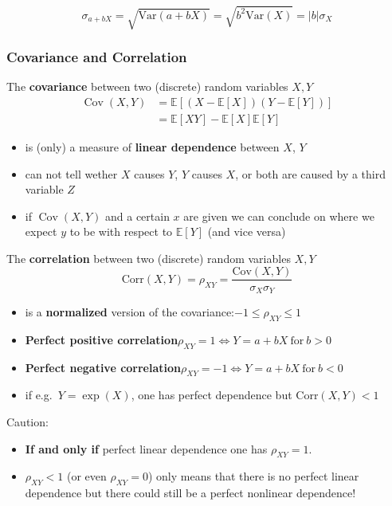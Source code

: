 \noindent\begin{equation*}
    \sigma_{a+bX}=\sqrt{\mathrm{Var}(a+bX)}=\sqrt{b^2\mathrm{Var}(X)}=|b|\sigma_X
\end{equation*}

\subsubsection{Covariance and Correlation}
The \textbf{covariance} between two (discrete) random variables $X,Y$
\noindent\begin{align*}
    \operatorname{Cov}(X,Y) & =\mathbb{E}[(X-\mathbb{E}[X])(Y-\mathbb{E}[Y])] \\
                            & = \mathbb{E}[XY]-\mathbb{E}[X]\mathbb{E}[Y]
\end{align*}
\begin{itemize}
    \item is (only) a measure of \textbf{linear dependence} between $X$, $Y$
    \item can not tell wether $X$ causes $Y$, $Y$ causes $X$, or both are caused by a third variable $Z$
    \item if $\operatorname{Cov}(X,Y)$ and a certain $x$ are given we can conclude on where we expect $y$ to be with respect to $\mathbb{E}[Y]$ (and vice versa)
\end{itemize}

\newpar{}
The \textbf{correlation} between two (discrete) random variables $X,Y$
\noindent\begin{equation*}
    \mathrm{Corr}(X,Y)=\rho_{XY}=\frac{\mathrm{Cov}(X,Y)}{\sigma_{X}\sigma_{Y}}
\end{equation*}
\begin{itemize}
    \item is a \textbf{normalized} version of the covariance:\newline$-1 \leq \rho_{XY} \leq 1$
    \item \textbf{Perfect positive correlation}\newline $\rho_{XY}=1\Leftrightarrow Y=a+bX\mathrm{~for~}b>0$
    \item \textbf{Perfect negative correlation}\newline $\rho_{XY}=-1\Leftrightarrow Y=a+bX\mathrm{~for~}b<0$
    \item if e.g.\ $Y=\exp(X)$, one has perfect dependence but $\mathrm{Corr}(X,Y)<1$
\end{itemize}

Caution:
\begin{itemize}
    \item \textbf{If and only if} perfect linear dependence one has $\rho_{XY}=1$.
    \item $\rho_{XY}<1$ (or even $\rho_{XY}=0$) only means that there is no perfect linear dependence but there could still be a perfect nonlinear dependence!
\end{itemize}


